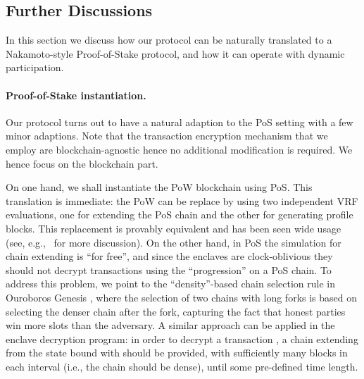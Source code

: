 \subsection{Further Discussions}
\label{subsec:further-discussions}

In this section we discuss how our protocol can be naturally translated to a Nakamoto-style Proof-of-Stake protocol, and how it can operate with dynamic participation.

\paragraph{Proof-of-Stake instantiation.}
%
Our protocol turns out to have a natural adaption to the PoS setting with a few minor adaptions.
%
Note that the transaction encryption mechanism that we employ are blockchain-agnostic hence no additional modification is required.
%
We hence focus on the blockchain part.

On one hand, we shall instantiate the \twoforone PoW blockchain using PoS.
%
This translation is immediate: the \twoforone PoW can be replace by using two independent VRF evaluations, one for extending the PoS chain and the other for generating profile blocks.
%
This replacement is provably equivalent and has been seen wide usage (see, e.g.,~\cite{TCC:FGKR20} for more discussion).
%
On the other hand, in PoS the simulation for chain extending is ``for free'', and since the enclaves are clock-oblivious they should not decrypt transactions using the ``progression'' on a PoS chain.
%
To address this problem, we point to the ``density''-based chain selection rule in Ouroboros Genesis \cite{CCS:BGKRZ18}, where the selection of two chains with long forks is based on selecting the denser chain after the fork, capturing the fact that honest parties win more slots than the adversary.
%
A similar approach can be applied in the enclave decryption program: in order to decrypt a transaction \tx, a chain extending from the state bound with \tx should be provided, with sufficiently many blocks in each interval (i.e., the chain should be dense), until some pre-defined time length.

